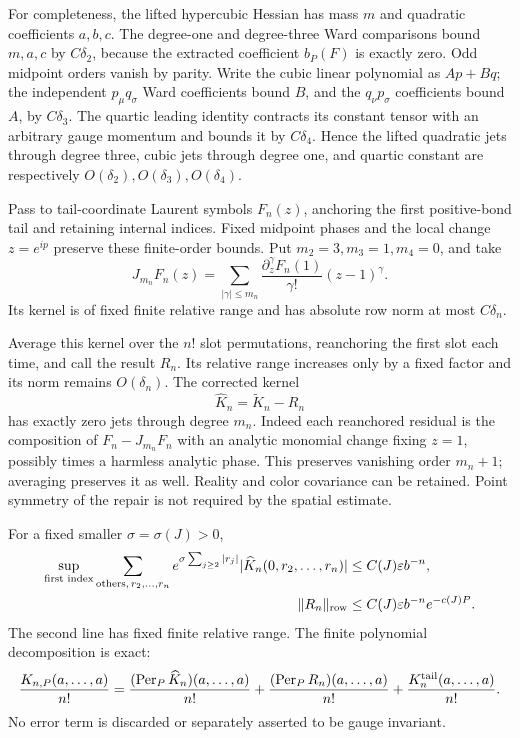 For completeness, the lifted hypercubic Hessian has
mass \(m\) and quadratic coefficients \(a,b,c\).
The degree-one and degree-three Ward comparisons bound
\(m,a,c\) by \(C\delta_2\), because the extracted
coefficient \(b_P(F)\) is exactly zero. Odd midpoint
orders vanish by parity. Write the cubic linear polynomial
as \(A p+B q\); the independent \(p_\mu q_\sigma\) Ward
coefficients bound \(B\), and the \(q_\nu p_\sigma\)
coefficients bound \(A\), by \(C\delta_3\). The quartic
leading identity contracts its constant tensor with an
arbitrary gauge momentum and bounds it by
\(C\delta_4\). Hence the lifted quadratic jets through
degree three, cubic jets through degree one, and quartic
constant are respectively \(O(\delta_2),O(\delta_3),
O(\delta_4)\).

Pass to tail-coordinate Laurent symbols \(F_n(z)\),
anchoring the first positive-bond tail and retaining
internal indices. Fixed midpoint phases and the local
change \(z=e^{ip}\) preserve these finite-order bounds.
Put \(m_2=3,m_3=1,m_4=0\), and take
\begin{equation}
 J_{m_n}F_n(z)=
    \sum_{|\gamma|\le m_n}
       \frac{\partial_z^\gamma F_n(1)}{\gamma!}
                         (z-1)^\gamma.
 \label{fcc-laurent-jet}
\end{equation}
Its kernel is of fixed finite relative range and has
absolute row norm at most \(C\delta_n\).

Average this kernel over the \(n!\) slot permutations,
reanchoring the first slot each time, and call the result
\(R_n\). Its relative range increases only by a fixed
factor and its norm remains \(O(\delta_n)\).
The corrected kernel
\begin{equation}
 \widehat K_n=\widetilde K_n-R_n
 \label{fcc-repaired-kernel}
\end{equation}
has exactly zero jets through degree \(m_n\). Indeed
each reanchored residual is the composition of
\(F_n-J_{m_n}F_n\) with an analytic monomial change
fixing \(z=1\), possibly times a harmless analytic
phase. This preserves vanishing order \(m_n+1\);
averaging preserves it as well. Reality and color
covariance can be retained. Point symmetry of the
repair is not required by the spatial estimate.

For a fixed smaller \(\sigma=\sigma(J)>0\),
\begin{align}
 \sup_{\text{first index}}\sum_{\text{others},\,r_2,\ldots,r_n}
 e^{\sigma\sum_{j\ge2}|r_j|}
      |\widehat K_n(0,r_2,\ldots,r_n)|
       &\le C(J)\varepsilon b^{-n},\notag\\
 \|R_n\|_{\rm row}
       &\le C(J)\varepsilon b^{-n}e^{-c(J)P}.
 \label{fcc-repaired-bounds}
\end{align}
The second line has fixed finite relative range.
The finite polynomial decomposition is exact:
\begin{equation}
 \frac{K_{n,P}(a,\ldots,a)}{n!}
  =\frac{(\operatorname{Per}_P\widehat K_n)(a,\ldots,a)}{n!}
   +\frac{(\operatorname{Per}_P R_n)(a,\ldots,a)}{n!}
   +\frac{K_n^{\rm tail}(a,\ldots,a)}{n!}.
 \label{fcc-polynomial-decomposition}
\end{equation}
No error term is discarded or separately asserted to
be gauge invariant.

